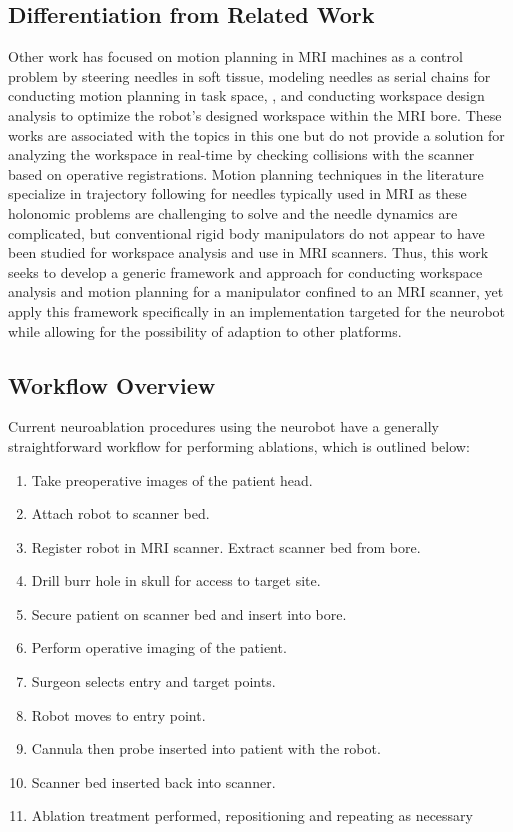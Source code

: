 \documentclass[12pt]{report}
\begin{document}
\subsection{Differentiation from Related Work}
Other work has focused on motion planning in MRI machines as a control problem by steering needles in soft tissue, \cite{needleSteeringSoftTissues} modeling needles as serial chains for conducting motion planning in task space, \cite{taskSpacePlanning}, and conducting workspace design analysis to optimize the robot's designed workspace within the MRI bore. \cite{prostateWorkspaceDesignAnalysis} \cite{workspaceOptimization} These works are associated with the topics in this one but do not provide a solution for analyzing the workspace in real-time by checking collisions with the scanner based on operative registrations. Motion planning techniques in the literature specialize in trajectory following for needles typically used in MRI as these holonomic problems are challenging to solve and the needle dynamics are complicated, but conventional rigid body manipulators do not appear to have been studied for workspace analysis and use in MRI scanners. Thus, this work seeks to develop a generic framework and approach for conducting workspace analysis and motion planning for a manipulator confined to an MRI scanner, yet apply this framework specifically in an implementation targeted for the neurobot while allowing for the possibility of adaption to other platforms. 

\subsection{Workflow Overview}
Current neuroablation procedures using the neurobot have a generally straightforward workflow for performing ablations, which is outlined below:

\singlespacing
\begin{enumerate}
\item Take preoperative images of the patient head.
\item Attach robot to scanner bed.
\item Register robot in MRI scanner. Extract scanner bed from bore.
\item Drill burr hole in skull for access to target site.
\item Secure patient on scanner bed and insert into bore.
\item Perform operative imaging of the patient.
\item Surgeon selects entry and target points.
\item Robot moves to entry point.
\item Cannula then probe inserted into patient with the robot.
\item Scanner bed inserted back into scanner.
\item Ablation treatment performed, repositioning and repeating as necessary
\end{enumerate}
\doublespacing
\end{document}
